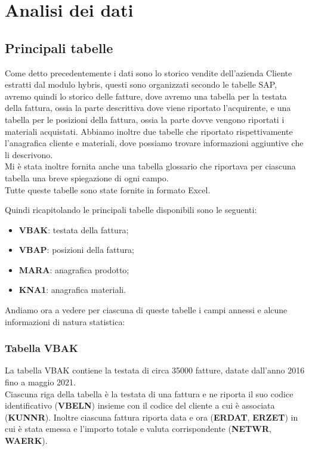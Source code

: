 
\hypertarget{(chap:capitolo3)}{}
\chapter{Analisi dei dati}
\section{Principali tabelle}
Come detto precedentemente i dati sono lo storico vendite dell'azienda Cliente estratti dal modulo hybris, questi sono organizzati secondo le tabelle SAP, avremo quindi lo storico delle fatture, dove avremo una tabella per la testata della fattura, ossia la parte descrittiva dove viene riportato l'acquirente, e una tabella per le posizioni della fattura, ossia la parte dovve vengono riportati i materiali acquistati. Abbiamo inoltre due tabelle che riportato rispettivamente l'anagrafica cliente e materiali, dove possiamo trovare informazioni aggiuntive che li descrivono.\\
Mi è stata inoltre fornita anche una tabella glossario che riportava per ciascuna tabella una breve spiegazione di ogni campo. \\
Tutte queste tabelle sono state fornite in formato Excel.

Quindi ricapitolando le principali tabelle disponibili sono le seguenti:
\begin{itemize}
	\item \textbf{VBAK}: testata della fattura;
	\item \textbf{VBAP}: posizioni della fattura;
	\item \textbf{MARA}: anagrafica prodotto;
	\item \textbf{KNA1}: anagrafica materiali.
\end{itemize}

Andiamo ora a vedere per ciascuna di queste tabelle i campi annessi e alcune informazioni di natura statistica:
\subsection{Tabella VBAK}
La tabella VBAK contiene la testata di circa 35000 fatture, datate dall'anno 2016 fino a maggio 2021.\\
Ciascuna riga della tabella è la testata di una fattura e ne riporta il suo codice identificativo (\textbf{VBELN}) insieme con il codice del cliente a cui è associata (\textbf{KUNNR}). Inoltre ciascuna fattura riporta data e ora (\textbf{ERDAT}, \textbf{ERZET}) in cui è stata emessa e l'importo totale e valuta corrispondente (\textbf{NETWR}, \textbf{WAERK}).


